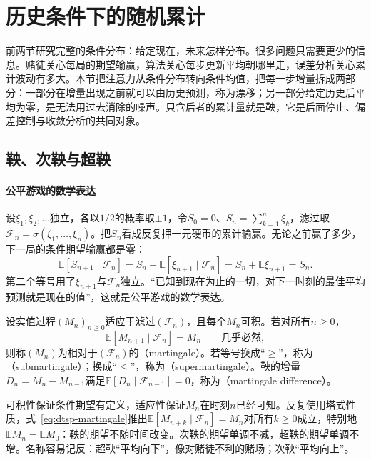 \section{历史条件下的随机累计}
\label{sec:dtsp-accumulation}

前两节研究完整的条件分布：给定现在，未来怎样分布。很多问题只需要更少的信息。赌徒关心每局的期望输赢，算法关心每步更新平均朝哪里走，误差分析关心累计波动有多大。本节把注意力从条件分布转向条件均值，把每一步增量拆成两部分：一部分在增量出现之前就可以由历史预测，称为漂移；另一部分给定历史后平均为零，是无法用过去消除的噪声。只含后者的累计量就是鞅，它是后面停止、偏差控制与收敛分析的共同对象。

\subsection{鞅、次鞅与超鞅}
\label{sec:dtsp-martingales}

\paragraph{公平游戏的数学表达}
设$\xi_1,\xi_2,\ldots$独立，各以$1/2$的概率取$\pm1$，令$S_0=0$、$S_n=\sum_{k=1}^n\xi_k$，滤过取$\mathcal F_n=\sigma(\xi_1,\ldots,\xi_n)$。把$S_n$看成反复押一元硬币的累计输赢。无论之前赢了多少，下一局的条件期望输赢都是零：
\[
  \mathbb E[S_{n+1}\mid\mathcal F_n]=S_n+\mathbb E[\xi_{n+1}\mid\mathcal F_n]=S_n+\mathbb E\xi_{n+1}=S_n.
\]
第二个等号用了$\xi_{n+1}$与$\mathcal F_n$独立。“已知到现在为止的一切，对下一时刻的最佳平均预测就是现在的值”，这就是公平游戏的数学表达。

\begin{definition}[鞅、次鞅与超鞅]
  \label{def:dtsp-martingale}
  设实值过程$(M_n)_{n\geq0}$适应于滤过$(\mathcal F_n)$，且每个$M_n$可积。若对所有$n\geq0$，
  \begin{equation}
    \mathbb E[M_{n+1}\mid\mathcal F_n]=M_n\qquad\text{几乎必然},
    \label{eq:dtsp-martingale}
  \end{equation}
  则称$(M_n)$为相对于$(\mathcal F_n)$的（martingale）。若等号换成“$\geq$”，称为（submartingale）；换成“$\leq$”，称为（supermartingale）。鞅的增量$D_n=M_n-M_{n-1}$满足$\mathbb E[D_n\mid\mathcal F_{n-1}]=0$，称为（martingale difference）。
\end{definition}

可积性保证条件期望有定义，适应性保证$M_n$在时刻$n$已经可知。反复使用塔式性质，式~\eqref{eq:dtsp-martingale}推出$\mathbb E[M_{n+k}\mid\mathcal F_n]=M_n$对所有$k\geq0$成立，特别地$\mathbb EM_n=\mathbb EM_0$：鞅的期望不随时间改变。次鞅的期望单调不减，超鞅的期望单调不增。名称容易记反：超鞅“平均向下”，像对赌徒不利的赌场；次鞅“平均向上”。

